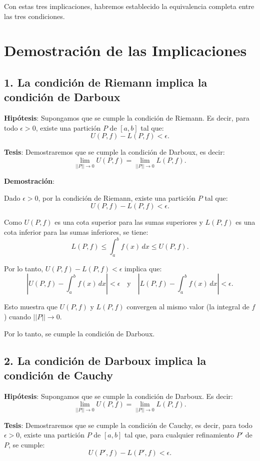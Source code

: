 \documentclass{article}
\begin{document}
Con estas tres implicaciones, habremos establecido la equivalencia completa entre las tres condiciones.

\section*{Demostración de las Implicaciones}

\subsection*{1. La condición de Riemann implica la condición de Darboux}

\textbf{Hipótesis}: Supongamos que se cumple la condición de Riemann. Es decir, para todo $\epsilon > 0$, existe una partición $P$ de $[a, b]$ tal que:
\[
U(P, f) - L(P, f) < \epsilon.
\]

\textbf{Tesis}: Demostraremos que se cumple la condición de Darboux, es decir:
\[
\lim_{||P|| \to 0} U(P, f) = \lim_{||P|| \to 0} L(P, f).
\]

\textbf{Demostración}:

Dado $\epsilon > 0$, por la condición de Riemann, existe una partición $P$ tal que:
\[
U(P, f) - L(P, f) < \epsilon.
\]

Como $U(P, f)$ es una cota superior para las sumas superiores y $L(P, f)$ es una cota inferior para las sumas inferiores, se tiene:
\[
L(P, f) \leq \int_a^b f(x) \, dx \leq U(P, f).
\]

Por lo tanto, $U(P, f) - L(P, f) < \epsilon$ implica que:
\[
|U(P, f) - \int_a^b f(x) \, dx| < \epsilon \quad \text{y} \quad |L(P, f) - \int_a^b f(x) \, dx| < \epsilon.
\]

Esto muestra que $U(P, f)$ y $L(P, f)$ convergen al mismo valor (la integral de $f$) cuando $||P|| \to 0$.

Por lo tanto, se cumple la condición de Darboux.

\subsection*{2. La condición de Darboux implica la condición de Cauchy}

\textbf{Hipótesis}: Supongamos que se cumple la condición de Darboux. Es decir:
\[
\lim_{||P|| \to 0} U(P, f) = \lim_{||P|| \to 0} L(P, f).
\]

\textbf{Tesis}: Demostraremos que se cumple la condición de Cauchy, es decir, para todo $\epsilon > 0$, existe una partición $P$ de $[a, b]$ tal que, para cualquier refinamiento $P'$ de $P$, se cumple:
\[
U(P', f) - L(P', f) < \epsilon.
\]
\end{document}
